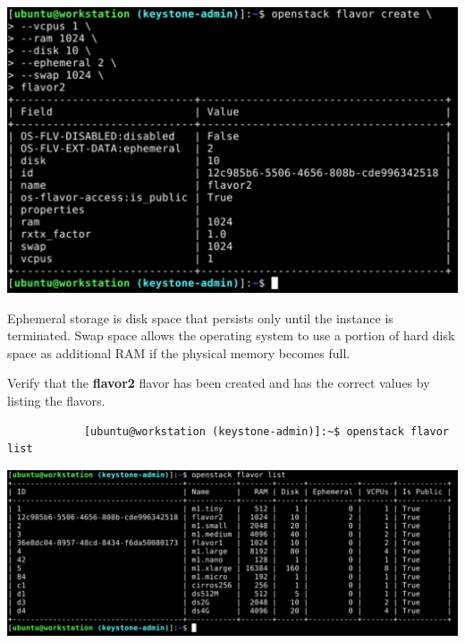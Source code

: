 \documentclass[letterpaper, 12pt]{article}
\begin{document}
\begin{enumerate}
\begin{labstep}
        \begin{center}
            \includegraphics[width=\linewidth]{images/part2/step8.png}
        \end{center}
    \end{labstep}

    \begin{notebox}
        Ephemeral storage is disk space that persists only until the instance is terminated.
        Swap space allows the operating system to use a portion of hard disk space as additional RAM if the physical memory becomes full.
    \end{notebox}

    \begin{labstep}
        Verify that the \textbf{flavor2} flavor has been created and has the correct values by listing the flavors.
        \begin{lstlisting}
            [ubuntu@workstation (keystone-admin)]:~$ openstack flavor list
        \end{lstlisting}

        \begin{center}
            \includegraphics[width=\linewidth]{images/part2/step9.png}
        \end{center}
    \end{labstep}


\end{enumerate}
\end{document}
